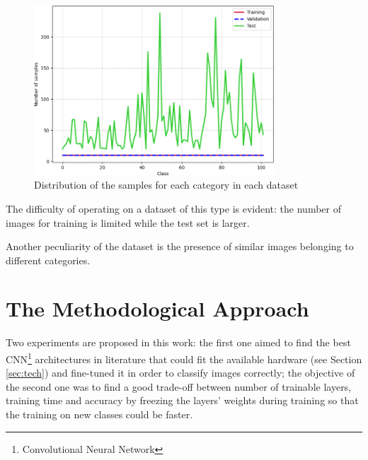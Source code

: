\begin{figure}[ht!]
\centering
\includegraphics[width=0.8\textwidth]{images/dist.png} 
\caption{Distribution of the samples for each category in each dataset}
\label{fig:dist}
\end{figure}

The difficulty of operating on a dataset of this type is evident: the number of images for training is limited while the test set is larger. 

\par
Another peculiarity of the dataset is the presence of similar images belonging to different categories.



















\section{The Methodological Approach}

Two experiments are proposed in this work: the first one aimed to find the best CNN\footnote{Convolutional Neural Network} architectures in 
literature that could fit the available hardware (see Section \ref{sec:tech}) and fine-tuned it in order to classify images correctly; the objective of the second one was to find a good trade-off between number of trainable layers, training time and accuracy by freezing the layers' weights during training so that the training on new classes could be faster. \par


